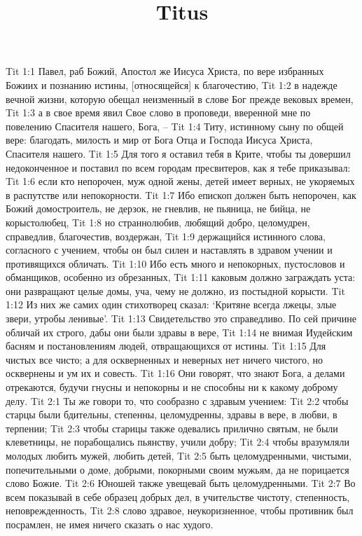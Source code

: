 

\title{Titus}

Tit 1:1  Павел, раб Божий, Апостол же Иисуса Христа, по вере избранных Божиих и познанию истины, [относящейся] к благочестию,
Tit 1:2  в надежде вечной жизни, которую обещал неизменный в слове Бог прежде вековых времен,
Tit 1:3  а в свое время явил Свое слово в проповеди, вверенной мне по повелению Спасителя нашего, Бога, --
Tit 1:4  Титу, истинному сыну по общей вере: благодать, милость и мир от Бога Отца и Господа Иисуса Христа, Спасителя нашего.
Tit 1:5  Для того я оставил тебя в Крите, чтобы ты довершил недоконченное и поставил по всем городам пресвитеров, как я тебе приказывал:
Tit 1:6  если кто непорочен, муж одной жены, детей имеет верных, не укоряемых в распутстве или непокорности.
Tit 1:7  Ибо епископ должен быть непорочен, как Божий домостроитель, не дерзок, не гневлив, не пьяница, не бийца, не корыстолюбец,
Tit 1:8  но страннолюбив, любящий добро, целомудрен, справедлив, благочестив, воздержан,
Tit 1:9  держащийся истинного слова, согласного с учением, чтобы он был силен и наставлять в здравом учении и противящихся обличать.
Tit 1:10  Ибо есть много и непокорных, пустословов и обманщиков, особенно из обрезанных,
Tit 1:11  каковым должно заграждать уста: они развращают целые домы, уча, чему не должно, из постыдной корысти.
Tit 1:12  Из них же самих один стихотворец сказал: `Критяне всегда лжецы, злые звери, утробы ленивые'.
Tit 1:13  Свидетельство это справедливо. По сей причине обличай их строго, дабы они были здравы в вере,
Tit 1:14  не внимая Иудейским басням и постановлениям людей, отвращающихся от истины.
Tit 1:15  Для чистых все чисто; а для оскверненных и неверных нет ничего чистого, но осквернены и ум их и совесть.
Tit 1:16  Они говорят, что знают Бога, а делами отрекаются, будучи гнусны и непокорны и не способны ни к какому доброму делу.
Tit 2:1  Ты же говори то, что сообразно с здравым учением:
Tit 2:2  чтобы старцы были бдительны, степенны, целомудренны, здравы в вере, в любви, в терпении;
Tit 2:3  чтобы старицы также одевались прилично святым, не были клеветницы, не порабощались пьянству, учили добру;
Tit 2:4  чтобы вразумляли молодых любить мужей, любить детей,
Tit 2:5  быть целомудренными, чистыми, попечительными о доме, добрыми, покорными своим мужьям, да не порицается слово Божие.
Tit 2:6  Юношей также увещевай быть целомудренными.
Tit 2:7  Во всем показывай в себе образец добрых дел, в учительстве чистоту, степенность, неповрежденность,
Tit 2:8  слово здравое, неукоризненное, чтобы противник был посрамлен, не имея ничего сказать о нас худого.
